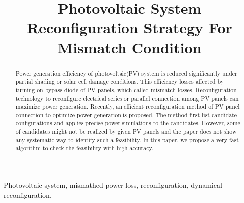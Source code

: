 \documentclass[conference]{IEEEtran}
\begin{document}
\title{Photovoltaic System Reconfiguration Strategy For Mismatch Condition\\
{\footnotesize \textsuperscript{}}}
\author{
\and
{}
\and
{}
}

\maketitle

\begin{abstract}
  Power generation efficiency of photovoltaic(PV) system is reduced significantly under partial shading or solar cell damage  conditions. This efficiency losses affected by turning on bypass diode of PV panels, which called mismatch losses. Reconfiguration technology to reconfigure electrical series or parallel connection among PV panels can maximize power generation. Recently, an efficient reconfiguration method of PV panel connection to optimize power generation is proposed. The method first list candidate configurations and applies precise power simulations to the candidates. However, some of candidates might not be realized by given PV panels and the paper does not show any systematic way to identify such a feasibility. In this paper, we propose a very fast algorithm to check the feasibility with high accuracy.
\end{abstract}

\begin{IEEEkeywords}
  Photovoltaic system, mismathed power loss, reconfiguration, dynamical reconfiguration.
\end{IEEEkeywords}
\end{document}
